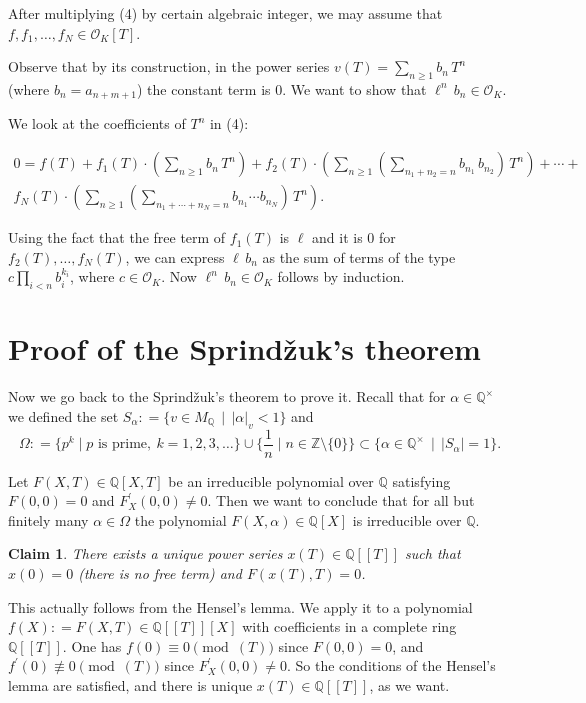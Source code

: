 \documentclass{article}
\newcommand{\dfn}{\mathrel{\mathop:}=}
\newcommand{\ZZ}{\mathbb{Z}}
\newcommand{\QQ}{\mathbb{Q}}
\renewcommand{\O}{\mathcal{O}}
\theoremstyle{myplain}
\newtheorem*{claim}{Claim}
\theoremstyle{mydefinition}
\begin{document}
After multiplying (4) by certain algebraic integer, we may assume that
$f, f_1, \ldots, f_N \in \O_K [T]$.

Observe that by its construction, in the power series
$v (T) = \sum\limits_{n \ge 1} b_n \, T^n$ (where $b_n = a_{n+m+1}$) the
constant term is $0$. We want to show that $\ell^n \, b_n \in \O_K$.

We look at the coefficients of $T^n$ in (4):

\begin{align*}
  0 = f (T) + f_1 (T)\cdot\left(\sum_{n \ge 1} b_n \, T^n\right) +
  f_2 (T)\cdot\left(\sum_{n\ge 1} \left(\sum_{n_1 + n_2 = n} b_{n_1}\,b_{n_2}\right) \, T^n\right) + \cdots +\\
  f_N (T)\cdot\left(\sum_{n\ge 1} \left(\sum_{n_1 + \cdots + n_N = n} b_{n_1}\cdots b_{n_N}\right) \, T^n\right).
\end{align*}

Using the fact that the free term of $f_1 (T)$ is $\ell$ and it is $0$ for
$f_2 (T), \ldots, f_N (T)$, we can express $\ell\,b_n$ as the sum of terms of
the type $c \prod\limits_{i < n} b_i^{k_i}$, where $c \in \O_K$. Now
$\ell^n \, b_n \in \O_K$ follows by induction.

\section{Proof of the Sprind\v{z}uk's theorem}

Now we go back to the Sprind\v{z}uk's theorem to prove it. Recall that for
$\alpha \in \QQ^\times$ we defined the set
$S_\alpha \dfn \{ v \in M_\QQ \,\mid\, |\alpha|_v < 1 \}$ and
\[ \Omega \dfn \{ p^k \mid p \text{ is prime}, ~ k = 1, 2, 3, \ldots \} \cup
  \{ \frac{1}{n} \mid n \in \ZZ\setminus\{0\} \} \subset
  \{ \alpha \in \QQ^\times \,\mid\, |S_\alpha| = 1 \}. \]

Let $F (X,T) \in \QQ [X,T]$ be an irreducible polynomial over $\QQ$ satisfying
$F (0,0) = 0$ and $F^\prime_X (0,0) \ne 0$. Then we want to conclude that for
all but finitely many $\alpha \in \Omega$ the polynomial
$F (X, \alpha) \in \QQ [X]$ is irreducible over $\QQ$.

\begin{claim}
  There exists a unique power series $x (T) \in \QQ [\![T]\!]$ such that
  $x (0) = 0$ (there is no free term) and $F (x(T),T) = 0$.
\end{claim}

This actually follows from the Hensel's lemma. We apply it to a polynomial
$f (X) \dfn F (X,T) \in \QQ [\![T]\!] [X]$ with coefficients in a complete ring
$\QQ [\![T]\!]$. One has $f (0) \equiv 0 \pmod{(T)}$ since $F (0,0) = 0$, and
$f^\prime (0) \not\equiv 0 \pmod{(T)}$ since $F^\prime_X (0,0) \ne 0$. So the
conditions of the Hensel's lemma are satisfied, and there is unique
$x (T) \in \QQ [\![T]\!]$, as we want.
\end{document}
